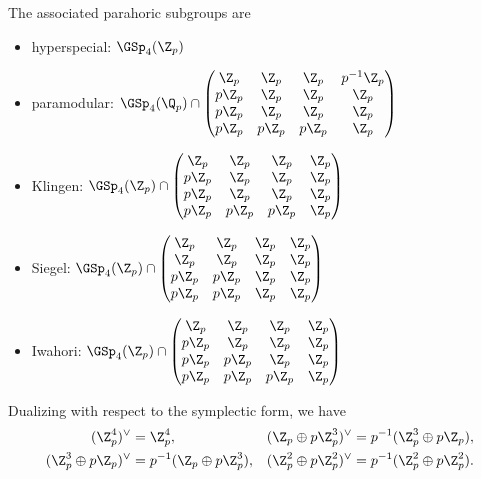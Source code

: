 \documentclass[a4paper]{scrartcl} %
\numberwithin{equation}{section}
\begin{document}
The associated parahoric subgroups are
\begin{itemize}
\item hyperspecial: $\GSp_4(\Z_p)$
\item paramodular: $\GSp_4(\Q_p) \cap
  \begin{pmatrix}
    \Z_p & \Z_p & \Z_p & p^{-1}\Z_p \\
    p\Z_p & \Z_p & \Z_p & \Z_p \\
    p\Z_p & \Z_p & \Z_p & \Z_p \\
    p\Z_p & p\Z_p & p\Z_p & \Z_p
  \end{pmatrix}
$
\item Klingen: $\GSp_4(\Z_p) \cap \begin{pmatrix}
    \Z_p & \Z_p & \Z_p & \Z_p \\
    p\Z_p & \Z_p & \Z_p & \Z_p \\
    p\Z_p & \Z_p & \Z_p & \Z_p \\
    p\Z_p & p\Z_p & p\Z_p & \Z_p
  \end{pmatrix}$
\item Siegel: $\GSp_4(\Z_p) \cap \begin{pmatrix}
    \Z_p & \Z_p & \Z_p & \Z_p \\
    \Z_p & \Z_p & \Z_p & \Z_p \\
    p\Z_p & p\Z_p & \Z_p & \Z_p \\
    p\Z_p & p\Z_p & \Z_p & \Z_p
  \end{pmatrix}$
\item Iwahori: $\GSp_4(\Z_p) \cap \begin{pmatrix}
    \Z_p & \Z_p & \Z_p & \Z_p \\
    p\Z_p & \Z_p & \Z_p & \Z_p \\
    p\Z_p & p\Z_p & \Z_p & \Z_p \\
    p\Z_p & p\Z_p & p\Z_p & \Z_p
  \end{pmatrix}$
\end{itemize}

\begin{Remark} Dualizing with respect to the symplectic form, we have
  \begin{align*}
    (\Z_p^4)^\vee&=\Z_p^4, &
                   (\Z_p\oplus p\Z_p^3)^\vee &= p^{-1}(\Z_p^3\oplus p\Z_p), \\
    (\Z_p^3\oplus p\Z_p)^\vee&=p^{-1}(\Z_p\oplus p\Z_p^3), &
                               (\Z_p^2\oplus p\Z_p^2)^\vee &= p^{-1}(\Z_p^2\oplus p\Z_p^2).
\end{align*}

\end{Remark}
\end{document}
